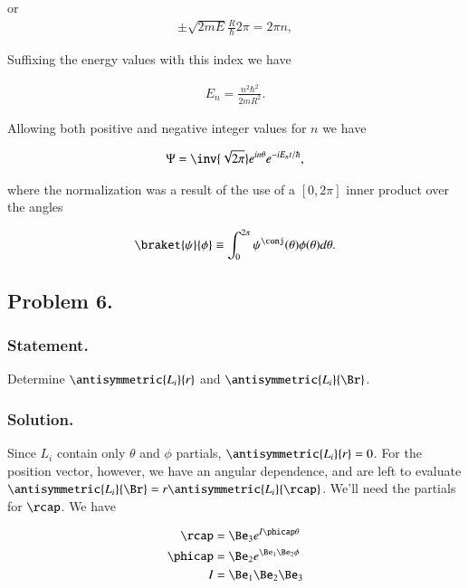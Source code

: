 or
\begin{align*}
\pm \sqrt{2m E} \frac{R}{\hbar} 2\pi = 2 \pi n,
\end{align*}

Suffixing the energy values with this index we have

\begin{align}\label{eqn:desaiCh4:505}
E_n = \frac{n^2 \hbar^2}{2 m R^2}.
\end{align}

Allowing both positive and negative integer values for $n$ we have

\begin{align}\label{eqn:desaiCh4:506}
\Psi = \inv{\sqrt{2\pi}} e^{i n \theta} e^{-i E_n t/\hbar},
\end{align}

where the normalization was a result of the use of a $[0,2\pi]$ inner product over the angles

\begin{align}\label{eqn:desaiCh4:507}
\braket{\psi}{\phi} \equiv \int_0^{2\pi} \psi^\conj(\theta) \phi(\theta) d\theta.
\end{align}

\subsection{Problem 6.}
\subsubsection{Statement.}

Determine $\antisymmetric{L_i}{r}$ and $\antisymmetric{L_i}{\Br}$.

\subsubsection{Solution.}

Since $L_i$ contain only $\theta$ and $\phi$ partials, $\antisymmetric{L_i}{r} = 0$.  For the position vector, however, we have an angular dependence, and are left to evaluate $\antisymmetric{L_i}{\Br} = r \antisymmetric{L_i}{\rcap}$.  We'll need the partials for $\rcap$.  We have

\begin{align}\label{eqn:desaiCh4:600}
\rcap &= \Be_3 e^{I \phicap \theta} \\
\phicap &= \Be_2 e^{\Be_1 \Be_2 \phi} \\
I &= \Be_1 \Be_2 \Be_3
\end{align}

